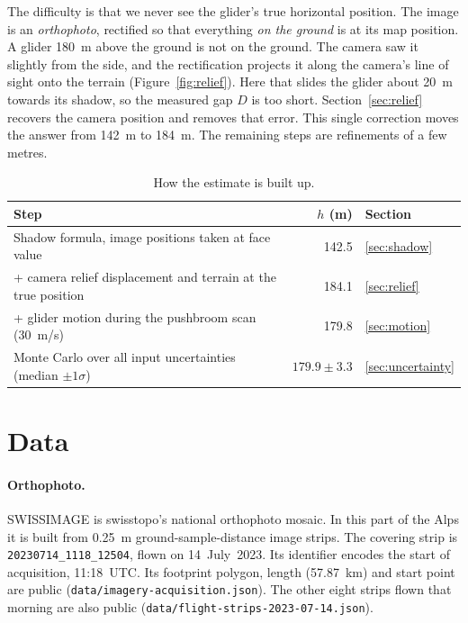 \documentclass[11pt,a4paper]{article}
\newcommand{\code}[1]{\texttt{#1}}
\begin{document}
The difficulty is that we never see the glider's true horizontal position. The
image is an \emph{orthophoto}, rectified so that everything \emph{on the ground}
is at its map position. A glider \SI{180}{m} above the ground is not on the ground. The camera
saw it slightly from the side, and the rectification projects it along the camera's line of sight onto the
terrain (Figure~\ref{fig:relief}). Here that slides the glider about
\SI{20}{m} towards its shadow, so the measured gap $D$ is too short. Section~\ref{sec:relief}
recovers the camera position and removes that error. This single correction moves the
answer from \SI{142}{m} to \SI{184}{m}. The remaining steps are refinements of a few metres.

\begin{table}[ht]
\centering
\begin{tabular}{@{}lrl@{}}
\toprule
Step & $h$ (m) & Section \\
\midrule
Shadow formula, image positions taken at face value & 142.5 & \ref{sec:shadow} \\
+ camera relief displacement and terrain at the true position & 184.1 & \ref{sec:relief} \\
+ glider motion during the pushbroom scan (\SI{30}{m/s}) & 179.8 & \ref{sec:motion} \\
Monte Carlo over all input uncertainties (median $\pm1\sigma$) & $179.9 \pm 3.3$ & \ref{sec:uncertainty} \\
\bottomrule
\end{tabular}
\caption{How the estimate is built up.}
\label{tab:steps}
\end{table}

\section{Data}\label{sec:data}

\paragraph{Orthophoto.} SWISSIMAGE is swisstopo's national orthophoto mosaic. In this part of the
Alps it is built from \SI{0.25}{m} ground-sample-distance image strips. The covering strip is
\code{20230714\_1118\_12504}, flown on 14~July~2023. Its identifier encodes the
start of acquisition, 11:18~UTC. Its footprint polygon, length (\SI{57.87}{km}) and start point are public
(\code{data/imagery-acquisition.json}). The other eight strips flown that morning are also public
(\code{data/flight-strips-2023-07-14.json}).
\end{document}
